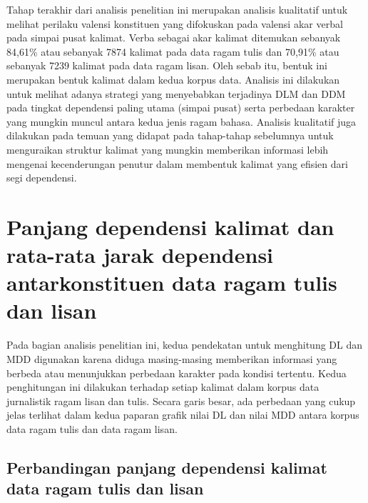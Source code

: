 Tahap terakhir dari analisis penelitian ini merupakan analisis kualitatif untuk melihat perilaku valensi konstituen yang difokuskan pada valensi akar verbal pada simpai pusat kalimat. Verba sebagai akar kalimat ditemukan sebanyak 84,61\% atau sebanyak 7874 kalimat pada data ragam tulis dan 70,91\% atau sebanyak 7239 kalimat pada data ragam lisan. Oleh sebab itu, bentuk ini merupakan bentuk kalimat dalam kedua korpus data. Analisis ini dilakukan untuk melihat adanya strategi yang menyebabkan terjadinya DLM dan DDM pada tingkat dependensi paling utama (simpai pusat) serta perbedaan karakter yang mungkin muncul antara kedua jenis ragam bahasa. Analisis kualitatif juga dilakukan pada temuan yang didapat pada tahap-tahap sebelumnya untuk menguraikan struktur kalimat yang mungkin memberikan informasi lebih mengenai kecenderungan penutur dalam membentuk kalimat yang efisien dari segi dependensi.

\section{Panjang dependensi kalimat dan rata-rata jarak dependensi antarkonstituen data ragam tulis dan lisan}
Pada bagian analisis penelitian ini, kedua pendekatan untuk menghitung DL dan MDD digunakan karena diduga masing-masing memberikan informasi yang berbeda atau menunjukkan perbedaan karakter pada kondisi tertentu. Kedua penghitungan ini dilakukan terhadap setiap kalimat dalam korpus data jurnalistik ragam lisan dan tulis. Secara garis besar, ada perbedaan yang cukup jelas terlihat dalam kedua paparan grafik nilai DL dan nilai MDD antara korpus data ragam tulis dan data ragam lisan.

\subsection{Perbandingan panjang dependensi kalimat data ragam tulis dan lisan}


